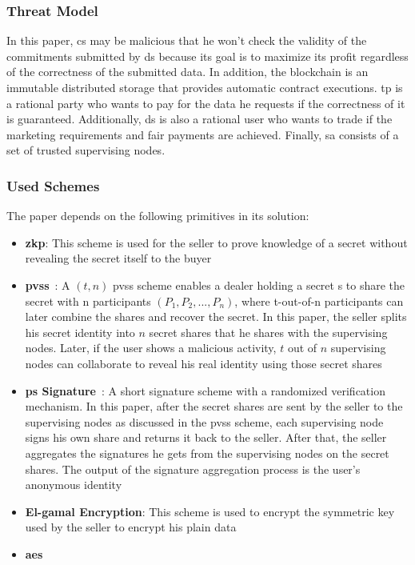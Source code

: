 \subsubsection{Threat Model}

In this paper, \ac{cs} may be malicious that he won't check the validity of the commitments submitted by \ac{ds} because its goal is to maximize its profit regardless of the correctness of the submitted data.
In addition, the blockchain is an immutable distributed storage that provides automatic contract executions.
\ac{tp} is a rational party who wants to pay for the data he requests if the correctness of it is guaranteed.
Additionally, \ac{ds} is also a rational user who wants to trade if the marketing requirements and fair payments are achieved.
Finally, \ac{sa} consists of a set of trusted supervising nodes.

\subsubsection{Used Schemes}
The paper depends on the following primitives in its solution:

\begin{itemize}
    \item \textbf{\ac{zkp}}: This scheme is used for the seller to prove knowledge of a secret without revealing the secret itself to the buyer
    \item \textbf{\ac{pvss}}~\cite{schoenmakers1999simple}: A $(t,n)$ \ac{pvss} scheme enables a dealer holding a secret s to share the secret with n participants $(P_1, P_2, ..., P_n)$, where t-out-of-n participants can later combine the shares and recover the secret. In this paper, the seller splits his secret identity into $n$ secret shares that he shares with the supervising nodes. Later, if the user shows a malicious activity, $t$ out of $n$ supervising nodes can collaborate to reveal his real identity using those secret shares
    \item \textbf{\ac{ps} Signature}~\cite{pointcheval2018reassessing}: A short signature scheme with a randomized verification mechanism. In this paper, after the secret shares are sent by the seller to the supervising nodes as discussed in the \ac{pvss} scheme, each supervising node signs his own share and returns it back to the seller. After that, the seller aggregates the signatures he gets from the supervising nodes on the secret shares. The output of the signature aggregation process is the user's anonymous identity
    \item \textbf{El-gamal Encryption}: This scheme is used to encrypt the symmetric key used by the seller to encrypt his plain data
    \item \textbf{\ac{aes}}
\end{itemize}

